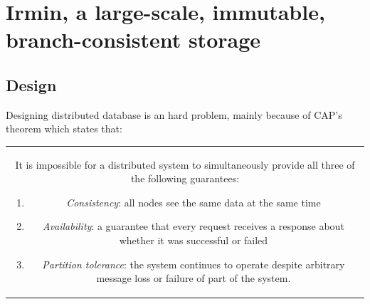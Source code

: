 \documentclass{article}
\renewcommand{\-}{\hyp}
\newcommand{\irmin}{Irmin\xspace}
\newcommand{\lwt}{Lwt\xspace}
\newcommand{\mirage}{Mirage\xspace}
\newcommand{\ocaml}{OCaml\xspace}
\newcommand{\xen}{Xen\xspace}
\begin{document}
%



\section{\irmin, a large-scale, immutable, branch-consistent storage}

\subsection{Design}

Designing distributed database is an hard problem, mainly because of CAP’s theorem\cite{BrewerConjecture2002} which states that:

\bigskip
\begin{tabular}{|c}
\begin{minipage}{0.9\textwidth}
It is impossible for a distributed system to simultaneously provide all three of the following guarantees:
\begin{enumerate}
	\item \emph{Consistency}: all nodes see the same data at the same time
	\item \emph{Availability}: a guarantee that every request receives a response about whether it was successful or failed
	\item \emph{Partition tolerance}: the system continues to operate despite arbitrary message loss or failure of part of the system.
\end{enumerate}
\end{minipage}
\end{tabular}
\bigskip
\end{document}
